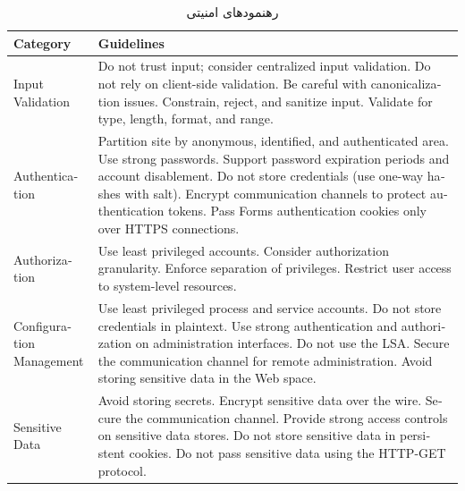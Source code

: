 \begin{table}[H] 
        \centering \caption{رهنمودهای امنیتی}
        \label{tab:guid}
        \renewcommand*{\arraystretch}{2}
 \begin{latin}


 \begin{tabular}{ p{3cm} p{11cm} }
            \hline
  
			\bf Category & \bf Guidelines\\
            \hline
 			 Input Validation & Do not trust input; consider centralized input validation. Do not rely on client-side validation. Be careful with canonicalization issues. Constrain, reject, and sanitize input. Validate for type, length, format, and range.\\
 			 
 			 Authentication & Partition site by anonymous, identified, and authenticated area. Use strong passwords. Support password expiration periods and account disablement. Do not store credentials (use one-way hashes with salt). Encrypt communication channels to protect authentication tokens. Pass Forms authentication cookies only over HTTPS connections.\\
 			 Authorization & Use least privileged accounts. Consider authorization granularity. Enforce separation of privileges. Restrict user access to system-level resources.\\
 			 Configuration Management & Use least privileged process and service accounts. Do not store credentials in plaintext. Use strong authentication and authorization on administration interfaces. Do not use the LSA. Secure the communication channel for remote administration. Avoid storing sensitive data in the Web space.\\
 			 Sensitive Data & Avoid storing secrets. Encrypt sensitive data over the wire. Secure the communication channel. Provide strong access controls on sensitive data stores. Do not store sensitive data in persistent cookies. Do not pass sensitive data using the HTTP-GET protocol.\\
 			
        \end{tabular}
         \end{latin}
 \end{table}
 

